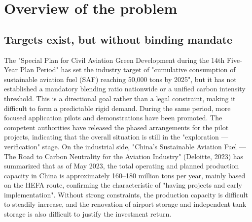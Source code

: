 \documentclass[a4paper,11pt]{article}
\begin{document}
\section{Overview of the problem}
\subsection{Targets exist, but without binding mandate}
The "Special Plan for Civil Aviation Green Development during the 14th Five-Year Plan Period" has set the industry target of "cumulative consumption of sustainable aviation fuel (SAF) reaching 50,000 tons by 2025", but it has not established a mandatory blending ratio nationwide or a unified carbon intensity threshold. This is a directional goal rather than a legal constraint, making it difficult to form a predictable rigid demand. During the same period, more focused application pilots and demonstrations have been promoted. The competent authorities have released the phased arrangements for the pilot projects, indicating that the overall situation is still in the "exploration --- verification" stage. On the industrial side, "China's Sustainable Aviation Fuel --- The Road to Carbon Neutrality for the Aviation Industry" (Deloitte, 2023) has summarized that as of May 2023, the total operating and planned production capacity in China is approximately 160--180 million tons per year, mainly based on the HEFA route, confirming the characteristic of "having projects and early implementation". Without strong constraints, the production capacity is difficult to steadily increase, and the renovation of airport storage and independent tank storage is also difficult to justify the investment return.
\end{document}

